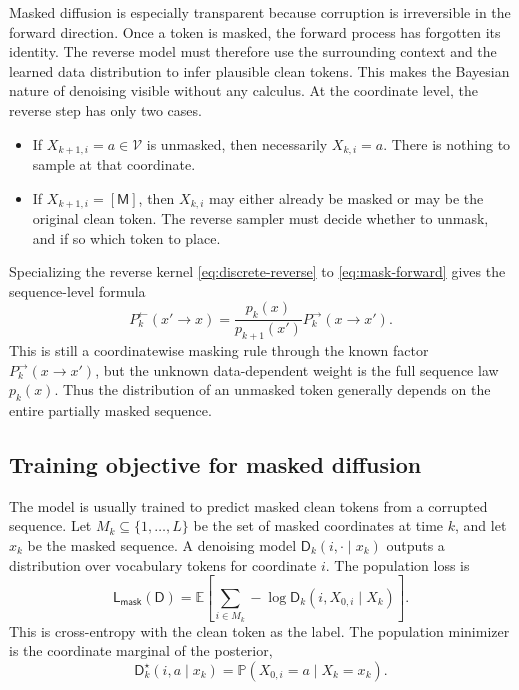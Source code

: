 \documentclass[10pt,a4paper]{amsart}
\numberwithin{equation}{section}
\newcommand{\E}{\mathbb{E}}
\newcommand{\Pp}{\mathbb{P}}
\newcommand{\mc}[1]{\mathcal{#1}}
\newcommand{\dstar}{\mathsf{D}^{\star}}
\newcommand{\denoiser}{\mathsf{D}}
\begin{document}
Masked diffusion is especially transparent because corruption is irreversible
in the forward direction.  Once a token is masked, the forward process has
forgotten its identity.  The reverse model must therefore use the surrounding
context and the learned data distribution to infer plausible clean tokens.
This makes the Bayesian nature of denoising visible without any calculus.  At
the coordinate level, the reverse step has only two cases.
\begin{itemize}
    \item If $X_{k+1,i}=a\in\mc{V}$ is unmasked, then necessarily
    $X_{k,i}=a$.  There is nothing to sample at that coordinate.
    \item If $X_{k+1,i}=[\mathsf M]$, then $X_{k,i}$ may either already be
    masked or may be the original clean token.  The reverse sampler must decide
    whether to unmask, and if so which token to place.
\end{itemize}
Specializing the reverse kernel \eqref{eq:discrete-reverse} to
\eqref{eq:mask-forward} gives the sequence-level formula
\begin{equation}\label{eq:mask-reverse-sequence}
    P_k^{\leftarrow}(x'\to x)
    =
    \frac{p_k(x)}{p_{k+1}(x')}
    P_k^{\to}(x\to x').
\end{equation}
This is still a coordinatewise masking rule through the known factor
$P_k^{\to}(x\to x')$, but the unknown data-dependent weight is the full
sequence law $p_k(x)$.  Thus the distribution of an unmasked token generally
depends on the entire partially masked sequence.

\subsection{Training objective for masked diffusion}

The model is usually trained to predict masked clean tokens from a corrupted
sequence.  Let $M_k\subseteq\{1,\ldots,L\}$ be the set of masked coordinates at
time $k$, and let $x_k$ be the masked sequence.  A denoising model
$\denoiser_k(i,\cdot\mid x_k)$ outputs a distribution over vocabulary
tokens for coordinate $i$.  The population loss is
\begin{equation}\label{eq:masked-loss}
    \mathsf L_{\mathsf{mask}}(\denoiser)
    =
    \E\left[
    \sum_{i\in M_k}
    -\log \denoiser_k(i,X_{0,i}\mid X_k)
    \right].
\end{equation}
This is cross-entropy with the clean token as the label.  The population
minimizer is the coordinate marginal of the posterior,
\[
    \dstar_k(i,a\mid x_k)
    =
    \Pp(X_{0,i}=a\mid X_k=x_k).
\]
\end{document}
